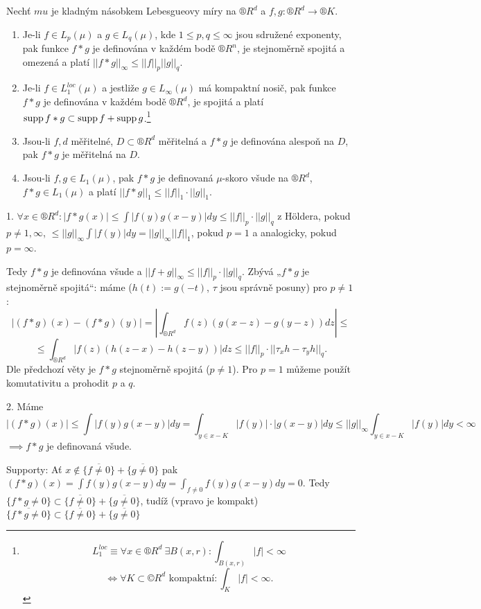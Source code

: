 \documentclass[12pt]{article}					%
\begin{document}
\begin{veta}
	Nechť $mu$ je kladným násobkem Lebesgueovy míry na $®R^d$ a $f, g: ®R^d \rightarrow ®K$.\vspace{-2em}

	\begin{enumerate}
		\item Je-li $f \in L_p(\mu)$ a $g \in L_q(\mu)$, kde $1 ≤ p, q ≤ ∞$ jsou sdružené exponenty, pak funkce $f*g$ je definována v každém bodě $®R^n$, je stejnoměrně spojitá a omezená a platí $||f * g||_∞ ≤ ||f||_p ||g||_q$.
		\item Je-li $f \in L_1^{loc}(\mu)$ a jestliže $g \in L_∞(\mu)$ má kompaktní nosič, pak funkce $f * g$ je definována v každém bodě $®R^d$, je spojitá a platí $\operatorname{supp} f*g \subset \operatorname{supp} f + \operatorname{supp} g$.\footnote{$$ L_1^{loc} ≡ \forall x \in ®R^d\ \exists B(x, r): \int_{B(x, r)} |f| < ∞ $$ $$ \Leftrightarrow \forall K \subset ©R^d \text{ kompaktní}: \int_K |f| < ∞. $$}
		\item Jsou-li $f, d$ měřitelné, $D \subset ®R^d$ měřitelná a $f*g$ je definována alespoň na $D$, pak $f*g$ je měřitelná na $D$.
		\item Jsou-li $f, g \in L_1(\mu)$, pak $f*g$ je definovaná $\mu$-skoro všude na $®R^d$, $f*g \in L_1(\mu)$ a platí $||f * g||_1 ≤ ||f||_1·||g||_1$.
	\end{enumerate}

	\begin{dukazin}
		1. $\forall x \in ®R^d: |f*g(x)| ≤ \int |f(y)g(x - y)| dy ≤ ||f||_p·||g||_q$ z Höldera, pokud $p ≠ 1, ∞$, $≤ ||g||_∞ \int|f(y)| dy = ||g||_∞ ||f||_1$, pokud $p = 1$ a analogicky, pokud $p = ∞$.

		Tedy $f * g$ je definována všude a $||f + g||_∞ ≤ ||f||_p·||g||_q$. Zbývá „$f*g$ je stejnoměrně spojitá“: máme ($h(t) := g(-t)$, $\tau$ jsou správně posuny) pro $p ≠ 1$:
		$$ |(f * g)(x) - (f * g)(y)| = \left|\int_{®R^d} f(z)(g(x - z) - g(y - z))dz \right| ≤ $$
		$$ ≤ \int_{®R^d} |f(z)(h(z - x) - h(z - y))| dz ≤ ||f||_p · ||\tau_x h - \tau_y h||_q. $$
		Dle předchozí věty je $f * g$ stejnoměrně spojitá ($p ≠ 1$). Pro $p = 1$ můžeme použít komutativitu a prohodit $p$ a $q$.

		2. Máme
		$$ |(f * g)(x)| ≤ \int |f(y)g(x - y)|dy = \int_{y \in x - K} |f(y)|·|g(x - y)| dy ≤ ||g||_∞ \int_{y \in x - K} |f(y)| dy < ∞ $$
		$\implies f*g$ je definovaná všude.

		Supporty: Ať $x \notin \overline{\{f ≠ 0\}} + \overline{\{g ≠ 0\}}$ pak $(f * g)(x) = \int f(y) g(x - y) dy = \int_{f ≠ 0} f(y) g(x - y) dy = 0$. Tedy $\{f * g ≠ 0\} \subset \overline{\{f ≠ 0\}} + \overline{\{g ≠ 0\}}$, tudíž (vpravo je kompakt) $\overline{\{f * g ≠ 0\}} \subset \overline{\{f ≠ 0\}} + \overline{\{g ≠ 0\}}$


\end{dukazin}
\end{veta}
\end{document}
